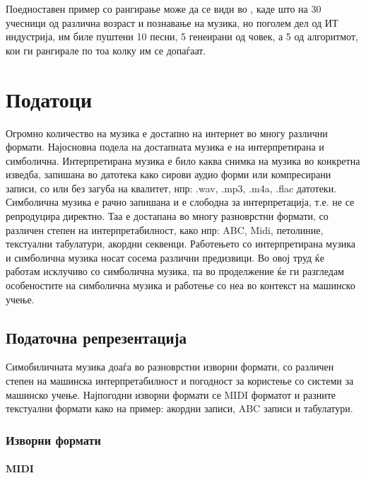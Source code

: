Поедноставен пример со рангирање може да се види во \cite{GarciaSalas2011}, каде што на 30 учесници од различна возраст и познавање на музика, но поголем дел од ИТ индустрија, им биле пуштени 10 песни, 5 генеирани од човек, а 5 од алгоритмот, кои ги рангирале по тоа колку им се допаѓаат.

\chapter{Податоци}
\label{ch:podatoci}

Огромно количество на музика е достапно на интернет во многу различни формати. Најосновна подела на достапната музика е на интерпретирана и симболична. Интерпретирана музика е било каква снимка на музика во конкретна изведба, запишана во датотека како сирови аудио форми или компресирани записи, со или без загуба на квалитет, нпр: .wav, .mp3, .m4a, .flac датотеки. Симболична музика е рачно запишана и е слободна за интерпретација, т.е. не се репродуцира директно. Таа е достапана во многу разноврстни формати, со различен степен на интерпретабилност, како нпр: ABC, Midi, петолиние, текстуални табулатури, акордни секвенци.
Работењето со интерпретирана музика и симболична музика носат сосема различни предизвици. Во овој труд ќе работам исклучиво со симболична музика, па во проделжение ќе ги разгледам особеностите на симболична музика и работење со неа во контекст на машинско учење.

\section{Податочна репрезентација}

Симобиличната музика доаѓа во разноврстни изворни формати, со различен степен на машинска интерпретабилност и погодност за користење со системи за машинско учење. Најпогодни изворни формати се MIDI форматот и разните текстуални формати како на пример: акордни записи, ABC записи и табулатури. 

\subsection{Изворни формати}

\subsubsection{MIDI}

